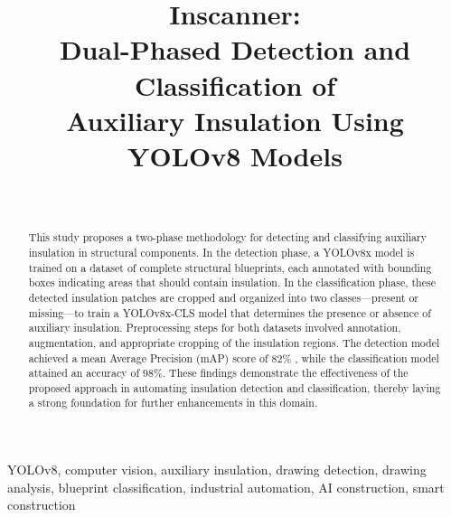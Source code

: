 \documentclass[]{IEEEphot}
\begin{document}
\title{Inscanner:\\Dual-Phased Detection and Classification of\\ Auxiliary Insulation Using YOLOv8 Models}

\author{
    \\
}


\maketitle
\begin{abstract}
This study proposes a two-phase methodology for detecting and classifying auxiliary insulation in structural components. In the detection phase, a YOLOv8x model is trained on a dataset of complete structural blueprints, each annotated with bounding boxes indicating areas that should contain insulation. In the classification phase, these detected insulation patches are cropped and organized into two classes—present or missing—to train a YOLOv8x-CLS model that determines the presence or absence of auxiliary insulation. Preprocessing steps for both datasets involved annotation, augmentation, and appropriate cropping of the insulation regions. The detection model achieved a mean Average Precision (mAP) score of 82\%
, while the classification model attained an accuracy of 98\%. These findings demonstrate the effectiveness of the proposed approach in automating insulation detection and classification, thereby laying a strong foundation for further enhancements in this domain.
\end{abstract}

\begin{IEEEkeywords}
YOLOv8, computer vision, auxiliary insulation, drawing detection, drawing analysis, blueprint classification, industrial automation, AI construction, smart construction
\end{IEEEkeywords}
\end{document}
